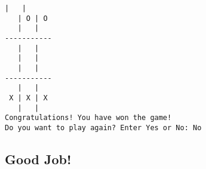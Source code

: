 \documentclass[11pt]{article}
\begin{document}
    \begin{Verbatim}[commandchars=\\\{\}]
   |   |
   | O | O
   |   |
-----------
   |   |
   |   |  
   |   |
-----------
   |   |
 X | X | X
   |   |
Congratulations! You have won the game!
Do you want to play again? Enter Yes or No: No

    \end{Verbatim}

    \subsection{Good Job!}\label{good-job}


    
    
    
    
\end{document}

